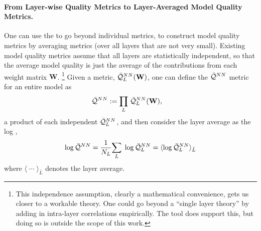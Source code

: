 \paragraph{From Layer-wise Quality Metrics to Layer-Averaged Model Quality Metrics.}
One can use the \HTSR \Phenomenology to go beyond individual \LayerQuality metrics, to construct model quality metrics by averaging \LayerQuality metrics (over all layers that are not very small). 
Existing \HTSR model quality metrics assume that all layers are statistically independent, so that the average model quality is just the average of the contributions from each weight matrix $\mathbf{W}$.%
\footnote{This independence assumption, clearly a mathematical convenience, gets us closer to a workable theory. One could go beyond a ``single layer theory'' by adding in intra-layer correlations empirically. The \WW tool does support this, but doing so is outside the scope of this work.}
%
Given a \LayerQuality metric, $\bar{\mathcal{Q}}^{NN}_{L}(\mathbf{W})$, one can define the \emph{\ModelQuality} $\bar{\mathcal{Q}}^{NN}$ metric for an entire model as 
\begin{align}
\label{eqn:ProductNorm}
\bar{\mathcal{Q}}^{NN}&:=\underset{L}{\prod}\;\bar{\mathcal{Q}}^{NN}_{L}(\mathbf{W}) ,
\end{align}
a product of each independent \LayerQuality $\bar{\mathcal{Q}}^{NN}_{L}$, and then consider the layer average as the log \emph{\LayerQuality},
\begin{align}
\label{eqn:LogProductNorm}
\log\bar{\mathcal{Q}}^{NN}=\frac{1}{N_{L}}\underset{L}{\sum}\;\log\bar{\mathcal{Q}}^{NN}_{L}=\langle\log\bar{\mathcal{Q}}^{NN}_{L}\rangle_{\bar{L}}
\end{align}
where $\langle\;\cdots\;\rangle_{\bar{L}}$ denotes the layer average.

